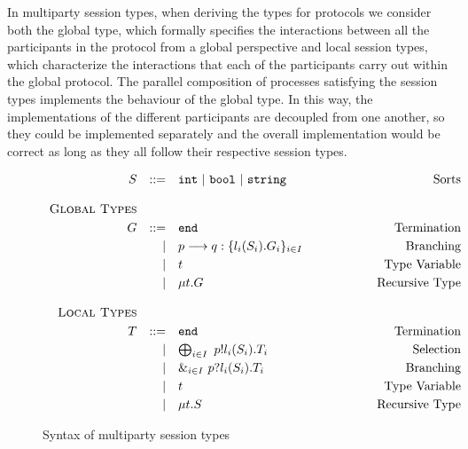 \documentclass[12pt,twoside]{report}
\newcommand{\white}{\ \ \ \ \ \ \ \ \ \ \ \ }
\begin{document}
In multiparty session types, when deriving the types for protocols we consider both the global type, which formally specifies the interactions between all the participants in the protocol from a global perspective and local session types, which characterize the interactions that each of the participants carry out within the global protocol. The parallel composition of processes satisfying the session types implements the behaviour of the global type. In this way, the implementations of the different participants are decoupled from one another, so they could be implemented separately and the overall implementation would be correct as long as they all follow their respective session types.

\begin{figure}[h]
    \centering
    \begin{equation*}
    \centering
    \begin{array}{rrlcr}
        S & ::= & \texttt{int}\ |\ \texttt{bool}\ |\ \texttt{string}& \white & \text{Sorts}\\\\
        \textsc{Global\ Types} & && &\\[3pt]
        G & ::= & \texttt{end} & \white & \text{Termination}  \\[2.75pt]
             & | & p \longrightarrow q: \{l_i( S_i).G_i\}_{i \in I} & \white & \text{Branching} \\[2.75pt] 
             & | & t & \white & \text{Type\ Variable} \\[2.75pt]
             & | & \mu t.G & \white & \text{Recursive\ Type}\\\\
             
        \textsc{Local Types} &&&& \\[3pt]
        T & ::= & \texttt{end} & \white & \text{Termination}  \\[2.75pt]
          & | & \bigoplus_{i \in I}\ p!l_i(S_i).T_i & \white& \text{Selection} \\[2.75pt]
          & | & \&_{i \in I}\ p?l_i(S_i).T_i & \white & \text{Branching} \\[2.75pt] 
          & | & t & \white & \text{Type\ Variable} \\[2.75pt]
          & | & \mu t.S & \white & \text{Recursive\ Type}
        
        \end{array}
    \end{equation*}
    \caption{Syntax of multiparty session types}
    \label{MPST_types}
\end{figure}{}
\end{document}
